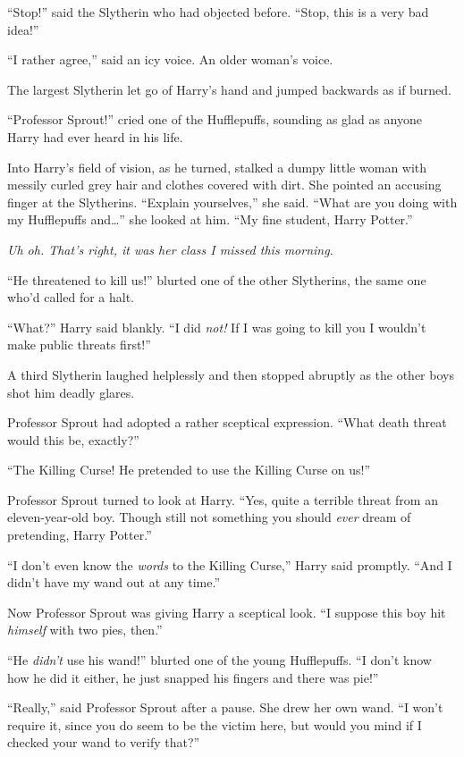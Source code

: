 “Stop!” said the Slytherin who had objected before. “Stop, this is a very bad idea!”

“I rather agree,” said an icy voice. An older woman’s voice.

The largest Slytherin let go of Harry’s hand and jumped backwards as if burned.

“Professor Sprout!” cried one of the Hufflepuffs, sounding as glad as anyone Harry had ever heard in his life.

Into Harry’s field of vision, as he turned, stalked a dumpy little woman with messily curled grey hair and clothes covered with dirt. She pointed an accusing finger at the Slytherins. “Explain yourselves,” she said. “What are you doing with my Hufflepuffs and…” she looked at him. “My fine student, Harry Potter.”

\emph{Uh oh. That’s right, it was \emph{her} class I missed this morning.}

“He threatened to kill us!” blurted one of the other Slytherins, the same one who’d called for a halt.

“What?” Harry said blankly. “I did \emph{not!} If I was going to kill you I wouldn’t make public threats first!”

A third Slytherin laughed helplessly and then stopped abruptly as the other boys shot him deadly glares.

Professor Sprout had adopted a rather sceptical expression. “What death threat would this be, exactly?”

“The Killing Curse! He pretended to use the Killing Curse on us!”

Professor Sprout turned to look at Harry. “Yes, quite a terrible threat from an eleven-year-old boy. Though still not something you should \emph{ever} dream of pretending, Harry Potter.”

“I don’t even know the \emph{words} to the Killing Curse,” Harry said promptly. “And I didn’t have my wand out at any time.”

Now Professor Sprout was giving Harry a sceptical look. “I suppose this boy hit \emph{himself} with two pies, then.”

“He \emph{didn’t} use his wand!” blurted one of the young Hufflepuffs. “I don’t know how he did it either, he just snapped his fingers and there was pie!”

“Really,” said Professor Sprout after a pause. She drew her own wand. “I won’t require it, since you do seem to be the victim here, but would you mind if I checked your wand to verify that?”

